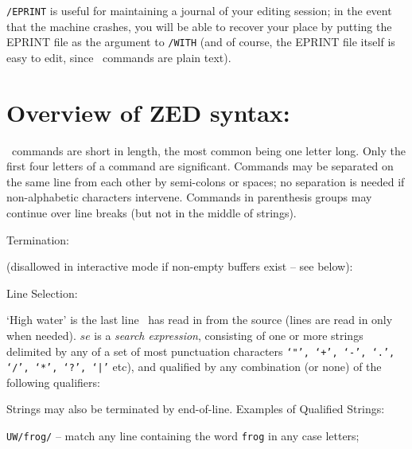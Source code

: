 {\tt /EPRINT} is useful for maintaining a journal of your editing
session; in the event that the machine crashes, you will be able
to recover your place by putting the EPRINT file as the argument
to {\tt /WITH} (and of course, the EPRINT file itself is easy to edit,
since \ZED\ commands are plain text).

\section{Overview of ZED syntax:}

\ZED\ commands are short in length, the most common being one letter
long.  Only the first four letters of a command are significant.
Commands may be separated on the same line from each other by semi-colons
or spaces; no separation is needed if non-alphabetic characters intervene.
Commands in parenthesis groups may continue over line breaks (but not
in the middle of strings).

Termination:

(disallowed in interactive mode if non-empty buffers exist -- see below):
\smallskip
{}

Line Selection:

`High water' is the last line \ZED\ has read in from the source (lines
are read in only when needed).
\vfill\eject
$se$ is a {\it search expression}, consisting of one or more
strings delimited by any of a set of most punctuation characters
{\tt `"', `+', `-', `.', `/', `*', `?', `|'} etc),
and qualified by any combination (or none) of the following qualifiers:
\medskip
{}

Strings may also be terminated by end-of-line.
\vfill
Examples of Qualified Strings:

{\tt UW/frog/} -- match any line containing the word
{\tt frog} in any case letters;

